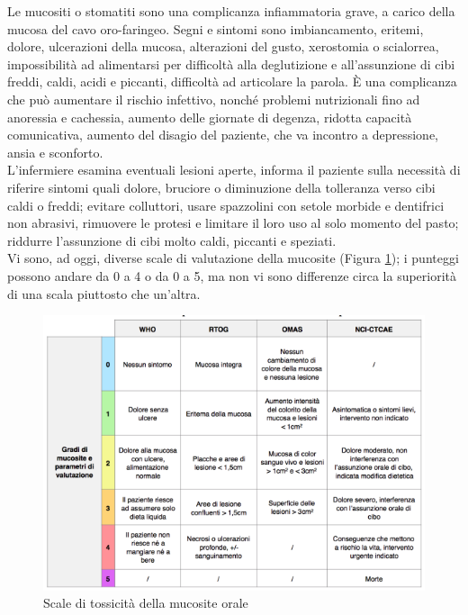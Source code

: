 Le mucositi o stomatiti sono una complicanza infiammatoria grave, a carico della mucosa del cavo oro-faringeo. 
Segni e sintomi sono imbiancamento, eritemi, dolore, ulcerazioni della mucosa, alterazioni del gusto, xerostomia o 
scialorrea, impossibilità ad alimentarsi per difficoltà alla deglutizione e all’assunzione di cibi freddi, caldi, 
acidi e piccanti, difficoltà ad articolare la parola. È una complicanza che può aumentare il rischio infettivo, 
nonché problemi nutrizionali fino ad anoressia e cachessia, aumento delle giornate di degenza, ridotta capacità 
comunicativa, aumento del disagio del paziente, che va incontro a depressione, ansia e sconforto\cite{mucositi}.\\ 
L’infermiere esamina eventuali lesioni aperte, informa il paziente sulla necessità di riferire 
sintomi quali dolore, bruciore o diminuzione della tolleranza verso cibi caldi o freddi; evitare colluttori, 
usare spazzolini con setole morbide e dentifrici non abrasivi, rimuovere le 
protesi e limitare il loro uso al solo momento del pasto; riddurre l'assunzione di cibi molto caldi, 
piccanti e speziati\cite{mucositi}.\\ 
Vi sono, ad oggi, diverse scale di valutazione della mucosite (Figura \ref{fig:FIGURE_4.2}); i punteggi possono 
andare da 0 a 4 o da 0 a 5, ma non vi sono differenze circa la superiorità di una scala piuttosto che un’altra\cite{SCALEmucositi}.

\begin{figure}[H]
    \begin{center}
    \includegraphics[width=0.7\columnwidth]{img/SCALEMUCOSITI.png}
    \vspace{-3mm}
    \end{center}
    \caption{Scale di tossicità della mucosite orale
    \cite{SCALEmucositi}}
    \label{fig:FIGURE_4.2}
\end{figure}

